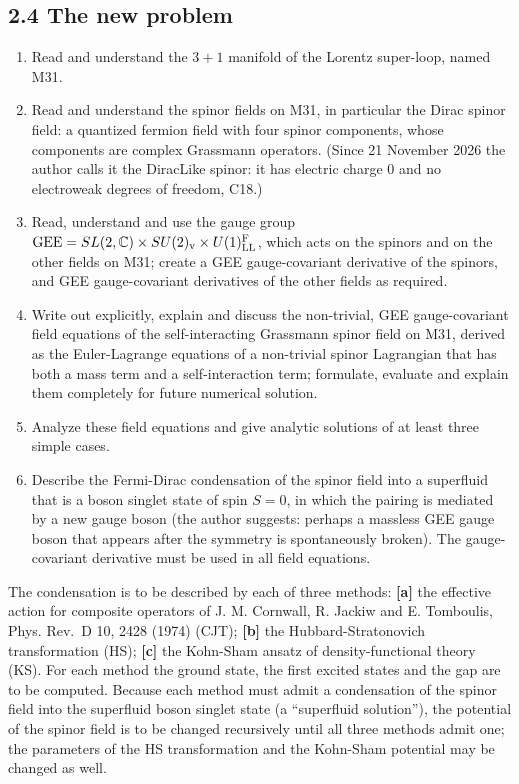 \documentclass[
  10pt,
]{article}
\providecommand{\tightlist}{%
  \setlength{\itemsep}{0pt}\setlength{\parskip}{0pt}}
\begin{document}
\hypertarget{the-new-problem}{%
\subsection{2.4 The new problem}\label{the-new-problem}}

\begin{enumerate}
\def\labelenumi{\arabic{enumi}.}
\tightlist
\item
  Read and understand the \(3+1\) manifold of the Lorentz super-loop,
  named M31.
\item
  Read and understand the spinor fields on M31, in particular the Dirac
  spinor field: a quantized fermion field with four spinor components,
  whose components are complex Grassmann operators. (Since 21 November
  2026 the author calls it the DiracLike spinor: it has electric charge
  0 and no electroweak degrees of freedom, C18.)
\item
  Read, understand and use the gauge group
  \(\mathrm{GEE}=SL(2,\mathbb C)\times SU(2)_{\rm v}\times U(1)^{\rm F}_{\rm LL}\),
  which acts on the spinors and on the other fields on M31; create a GEE
  gauge-covariant derivative of the spinors, and GEE gauge-covariant
  derivatives of the other fields as required.
\item
  Write out explicitly, explain and discuss the non-trivial, GEE
  gauge-covariant field equations of the self-interacting Grassmann
  spinor field on M31, derived as the Euler-Lagrange equations of a
  non-trivial spinor Lagrangian that has both a mass term and a
  self-interaction term; formulate, evaluate and explain them completely
  for future numerical solution.
\item
  Analyze these field equations and give analytic solutions of at least
  three simple cases.
\item
  Describe the Fermi-Dirac condensation of the spinor field into a
  superfluid that is a boson singlet state of spin \(S=0\), in which the
  pairing is mediated by a new gauge boson (the author suggests: perhaps
  a massless GEE gauge boson that appears after the symmetry is
  spontaneously broken). The gauge-covariant derivative must be used in
  all field equations.
\end{enumerate}

The condensation is to be described by each of three methods:
\textbf{{[}a{]}} the effective action for composite operators of J. M.
Cornwall, R. Jackiw and E. Tomboulis, Phys. Rev.~D 10, 2428 (1974)
(CJT); \textbf{{[}b{]}} the Hubbard-Stratonovich transformation (HS);
\textbf{{[}c{]}} the Kohn-Sham ansatz of density-functional theory (KS).
For each method the ground state, the first excited states and the gap
are to be computed. Because each method must admit a condensation of the
spinor field into the superfluid boson singlet state (a ``superfluid
solution''), the potential of the spinor field is to be changed
recursively until all three methods admit one; the parameters of the HS
transformation and the Kohn-Sham potential may be changed as well.
\end{document}
